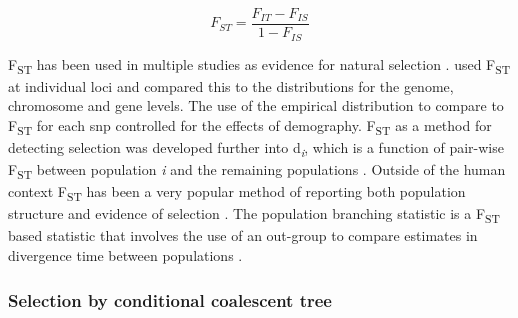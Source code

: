 \documentclass[]{report}
\begin{document}
\begin{equation} 
F_{ST} = \frac{F_{IT}{-}F_{IS}}{1{-}F_{IS}}
\label{eq:fst}
\end{equation}

F\textsubscript{ST} has been used in multiple studies as evidence for
natural selection
\citep{myles2007identification, pickrell2009signals, Akey2012}.
\citet{Akey2012} used F\textsubscript{ST} at individual loci and
compared this to the distributions for the genome, chromosome and gene
levels. The use of the empirical distribution to compare to
F\textsubscript{ST} for each \gls{snp} controlled for the effects of
demography. F\textsubscript{ST} as a method for detecting selection was
developed further into d\textsubscript{\emph{i}}, which is a function of
pair-wise F\textsubscript{ST} between population \emph{i} and the
remaining populations \citep{Akey2010}. Outside of the human context
F\textsubscript{ST} has been a very popular method of reporting both
population structure and evidence of selection
\citep{Akey2010, Hancock2011, Qanbari2011, Wei2015b}. The population
branching statistic is a F\textsubscript{ST} based statistic that
involves the use of an out-group to compare estimates in divergence time
between populations \citep{Yi2010b}.

\subsubsection{Selection by conditional coalescent
tree}\label{selection-by-conditional-coalescent-tree}
\end{document}
